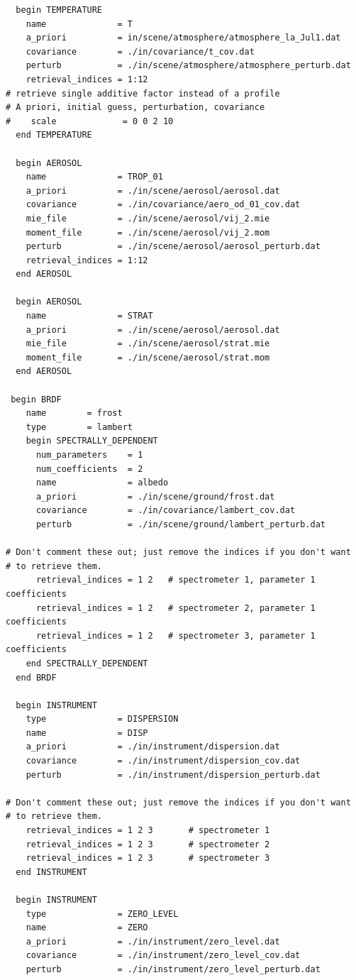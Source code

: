 \documentclass{article}
\begin{document}
\begin{verbatim}
  begin TEMPERATURE
    name              = T
    a_priori          = in/scene/atmosphere/atmosphere_la_Jul1.dat
    covariance        = ./in/covariance/t_cov.dat
    perturb           = ./in/scene/atmosphere/atmosphere_perturb.dat
    retrieval_indices = 1:12 
# retrieve single additive factor instead of a profile
# A priori, initial guess, perturbation, covariance
#    scale             = 0 0 2 10
  end TEMPERATURE

  begin AEROSOL
    name              = TROP_01
    a_priori          = ./in/scene/aerosol/aerosol.dat
    covariance        = ./in/covariance/aero_od_01_cov.dat
    mie_file          = ./in/scene/aerosol/vij_2.mie
    moment_file       = ./in/scene/aerosol/vij_2.mom
    perturb           = ./in/scene/aerosol/aerosol_perturb.dat
    retrieval_indices = 1:12 
  end AEROSOL

  begin AEROSOL
    name              = STRAT
    a_priori          = ./in/scene/aerosol/aerosol.dat
    mie_file          = ./in/scene/aerosol/strat.mie
    moment_file       = ./in/scene/aerosol/strat.mom
  end AEROSOL

 begin BRDF
    name        = frost
    type        = lambert
    begin SPECTRALLY_DEPENDENT
      num_parameters    = 1 
      num_coefficients  = 2
      name              = albedo
      a_priori          = ./in/scene/ground/frost.dat
      covariance        = ./in/covariance/lambert_cov.dat
      perturb           = ./in/scene/ground/lambert_perturb.dat

# Don't comment these out; just remove the indices if you don't want
# to retrieve them.  
      retrieval_indices = 1 2   # spectrometer 1, parameter 1 coefficients
      retrieval_indices = 1 2   # spectrometer 2, parameter 1 coefficients
      retrieval_indices = 1 2   # spectrometer 3, parameter 1 coefficients
    end SPECTRALLY_DEPENDENT
  end BRDF

  begin INSTRUMENT
    type              = DISPERSION
    name              = DISP
    a_priori          = ./in/instrument/dispersion.dat
    covariance        = ./in/instrument/dispersion_cov.dat
    perturb           = ./in/instrument/dispersion_perturb.dat

# Don't comment these out; just remove the indices if you don't want
# to retrieve them.  
    retrieval_indices = 1 2 3       # spectrometer 1
    retrieval_indices = 1 2 3       # spectrometer 2
    retrieval_indices = 1 2 3       # spectrometer 3
  end INSTRUMENT

  begin INSTRUMENT
    type              = ZERO_LEVEL
    name              = ZERO
    a_priori          = ./in/instrument/zero_level.dat
    covariance        = ./in/instrument/zero_level_cov.dat
    perturb           = ./in/instrument/zero_level_perturb.dat


\end{verbatim}
\end{document}
